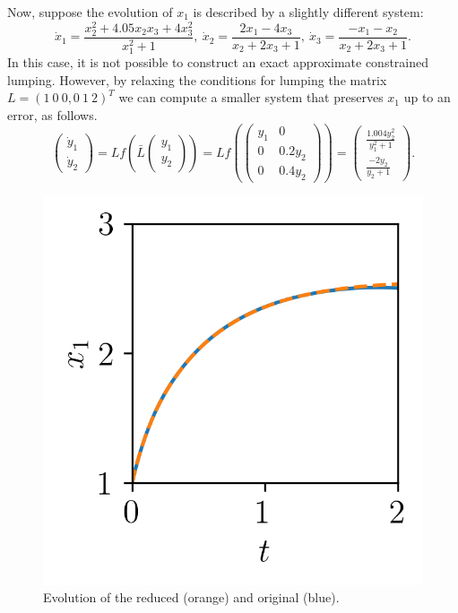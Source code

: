 Now, suppose the evolution of $x_1$ is described by a slightly different system:
\begin{equation} \label{eq:examplepert}
	\dot{x}_{1} = \frac {x_{2}^{2} +4.05x_{2}x_{3} +4x_{3}^{2}}{x_{1}^{2} + 1 },~
	\dot{x}_{2} = \frac{2x_{1}-4x_{3}}{x_{2}+2x_{3} + 1},~
	\dot{x}_{3} = \frac{-x_{1}-x_{2}}{x_{2}+2x_{3}+1}.
\end{equation}
In this case, it is not possible to construct an exact approximate constrained lumping.
However, by relaxing the conditions for lumping the matrix $L = (1 \ 0\ 0, 0\ 1\  2)^{T}$ we can compute a smaller system that preserves $x_1$ up to an error, as follows.
\begin{equation*}
	\begin{pmatrix}
		\dot{y}_{1} \\
		\dot{y}_{2}
	\end{pmatrix}
	= L f \left(  \bar{L}        \begin{pmatrix}
		y_{1} \\
		y_{2}
	\end{pmatrix}
	\right)
	=
	L f \left(
	\begin{pmatrix}
			y_{1} & 0        \\
			0     & 0.2y_{2} \\
			0     & 0.4y_{2}
		\end{pmatrix} \right)
	=
	\begin{pmatrix}
		\frac{1.004y_{2}^{2}}{y_{1}^{2}+1} \\
		\frac{-2y_{2}}{y_{2}+1}
	\end{pmatrix}.
\end{equation*}
\begin{figure}
	\centering
	\vspace{-0.5cm}
	\includegraphics[width=0.7\linewidth]{./img/sim_red_example.png}
	\caption{Evolution of the reduced (orange) and original (blue).}
	\label{fig:apperr:sim}
\end{figure}
